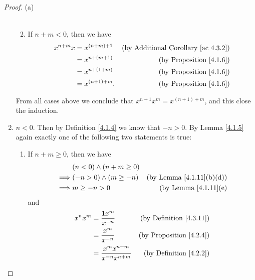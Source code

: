 \begin{proof}{(a)}
\begin{enumerate}[label=(\Roman*)]
\begin{enumerate}[label=(\roman*)]
\begin{align*}
                        \end{align*}
                  \item If \(n + m < 0\), then we have
                        \begin{align*}
                            x^{n + m} x & = x^{(n + m) + 1}  & \text{(by Additional Corollary \ref{ac 4.3.2})} \\
                                        & = x^{n + (m + 1)}  & \text{(by Proposition \ref{4.1.6})}             \\
                                        & = x^{n + (1 + m)}  & \text{(by Proposition \ref{4.1.6})}             \\
                                        & = x^{(n + 1) + m}. & \text{(by Proposition \ref{4.1.6})}
                        \end{align*}
              \end{enumerate}
              From all cases above we conclude that \(x^{n + 1} x^m = x^{(n + 1) + m}\), and this close the induction.
        \item \(n < 0\).
              Then by Definition \ref{4.1.4} we know that \(-n > 0\).
              By Lemma \ref{4.1.5} again exactly one of the following two statements is true:
              \begin{enumerate}[label=(\roman*)]
                  \item If \(n + m \geq 0\), then we have
                        \begin{align*}
                                     & (n < 0) \land (n + m \geq 0)                                        \\
                            \implies & (-n > 0) \land (m \geq -n)   & \text{(by Lemma \ref{4.1.11}(b)(d))} \\
                            \implies & m \geq -n > 0                & \text{(by Lemma \ref{4.1.11}(e)}
                        \end{align*}
                        and
                        \begin{align*}
                            x^n x^m & = \frac{1x^m}{x^{-n}}                    & \text{(by Definition \ref{4.3.11})}     \\
                                    & = \frac{x^m}{x^{-n}}                     & \text{(by Proposition \ref{4.2.4})}     \\
                                    & = \frac{x^m x^{n + m}}{x^{-n} x^{n + m}} & \text{(by Definition \ref{4.2.2})}      \\

\end{align*}
\end{enumerate}
\end{enumerate}
\end{proof}
